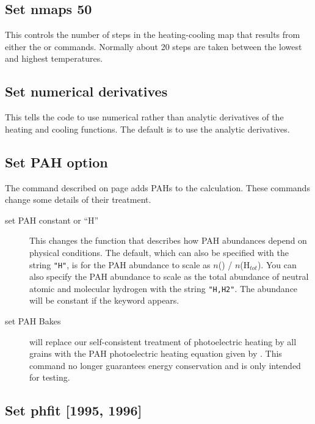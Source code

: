 \subsection{Set nmaps 50}

This controls the number of steps in the heating-cooling map that results
from either the  or  commands.  Normally about 20 steps are
taken between the lowest and highest temperatures.

\subsection{Set numerical derivatives}

This tells the code to use numerical rather than analytic derivatives
of the heating and cooling functions.
The default is to use the analytic derivatives.

\subsection{Set PAH option}
\label{sec:CommandSetPahOption}

The  command described on 
page \pageref{sec:GrainPAHcommands} adds PAHs to the calculation.
These  commands change some details of their treatment.

\begin{description}
\item[set PAH constant or ``H'']
This changes the function that describes how
PAH abundances depend on physical conditions.  The default, which can also
be specified with the string \verb|"H"|, is for the PAH abundance to
scale as $n$(\hO ) / $n$(H$_{tot}$).  You can also specify the PAH abundance
to scale as the total abundance of neutral atomic and molecular hydrogen
with the string \verb|"H,H2"|.
The abundance will be constant if the keyword
 appears.

\item[set PAH Bakes] will replace our self-consistent
treatment of photoelectric heating by all grains
with the PAH photoelectric heating equation given by \citet{Bakes1994}.
This command no longer guarantees energy conservation and is only intended for testing.
\end{description}

\subsection{Set phfit [1995, 1996]}

